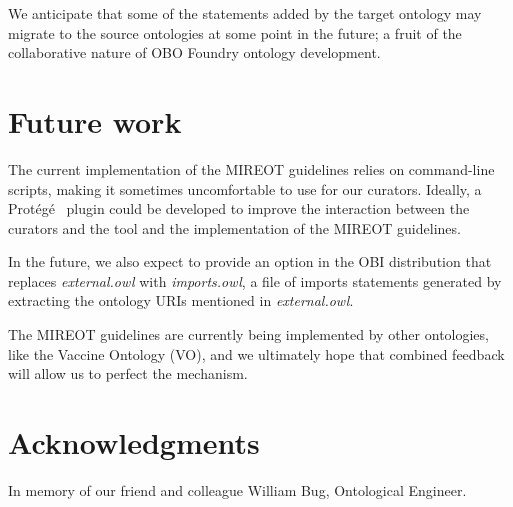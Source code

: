 \documentclass[a4paper,10pt,twocolumn]{article}
\newcommand{\protege}{Prot\'{e}g\'{e}}
\begin{document}
We anticipate that some of the statements added by the target ontology may migrate to the source ontologies at some point in the future; a fruit of the collaborative nature of OBO Foundry ontology development. 


\section*{Future work}
The current implementation of the \ac{MIREOT} guidelines relies on command-line scripts, making it sometimes uncomfortable to use for our curators.
Ideally, a \protege\ \cite{RefWorks:1501} plugin could be developed to improve the interaction between the curators and the tool and the implementation of the MIREOT guidelines.

In the future, we also expect to provide an option in the OBI distribution that replaces \emph{external.owl} with \emph{imports.owl}, a file of imports statements generated by extracting the ontology URIs mentioned in \emph{external.owl}.

The MIREOT guidelines are currently being implemented by other ontologies, like the Vaccine Ontology (VO)\cite{VO}, and we ultimately hope that combined feedback will allow us to perfect the mechanism.

\section*{Acknowledgments}

In memory of our friend and colleague William Bug, Ontological Engineer. 
\end{document}
